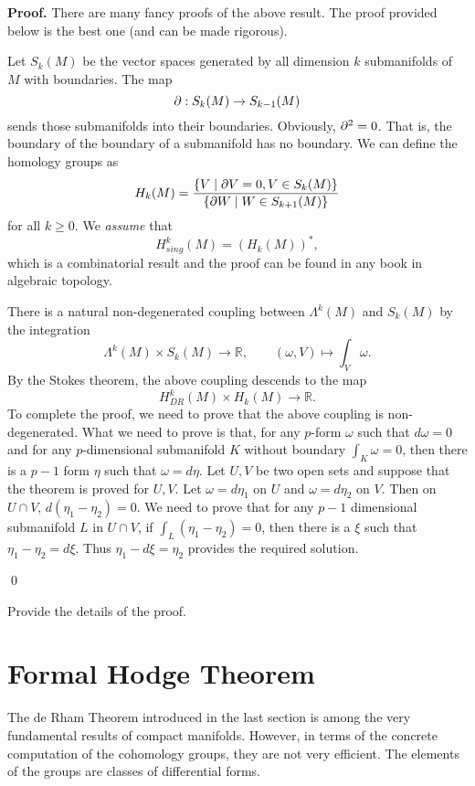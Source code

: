 {\bf Proof.} There are many fancy proofs of the above result. The proof provided below is the best one (and can be made rigorous).


Let $S_k(M)$ be the vector spaces generated by all dimension $k$ submanifolds of $M$ with boundaries. The map
\[
\partial: S_k(M)\to S_{k-1}(M)
\]
sends those submanifolds into their boundaries. Obviously, $\partial^2=0$. That is, the boundary of the boundary of a submanifold has no boundary.
We can define the homology groups as
\[
H_k(M)=\frac{\{V\mid \partial V=0,  V\in S_k(M)\}}{\{\partial W\mid W\in S_{k+1}(M)\}}
\]
for all $k\geq 0$. 
We {\it assume} that 
\[
H_{sing}^k(M)=(H_k(M))^*,
\]
which is a combinatorial result and the proof can be found in any book in algebraic topology.

There is a natural non-degenerated coupling between $\Lambda^k(M)$ and $S_k(M)$ by the integration
\[
\Lambda^k(M)\times S_k(M)\to \mathbb R,\qquad (\omega,V)\mapsto \int_V\omega.
\]
By the Stokes theorem, the above coupling descends to the map
\[
H^k_{DR}(M)\times H_k(M)\to\mathbb R.
\]
To complete the proof, we need to prove that the above coupling is non-degenerated. What we need to prove is that, for any $p$-form $\omega$ such that $d\omega=0$ and for any $p$-dimensional submanifold $K$ without boundary $\int_K\omega=0$, then there is a $p-1$ form $\eta$ such that $\omega=d\eta$. Let $U,V$ be two open sets and suppose that the theorem is proved for $U,V$. Let $\omega=d\eta_1$ on $U$ and $\omega=d\eta_2$ on $V$. Then on $U\cap V$, $d(\eta_1-\eta_2)=0$.
We need to prove that for any $p-1$ dimensional 
submanifold $L$ in $U\cap V$, if $\int _L(\eta_1-\eta_2)=0$, then there is a $\xi$ such that $\eta_1-\eta_2=d\xi$. Thus $\eta_1-d\xi=\eta_2$ provides the required solution.



\qed


\begin{ex} Provide the details of the proof.
\end{ex}

\section{Formal Hodge Theorem}\label{Formal_Hodge}

The de Rham  Theorem  introduced  in the last section is among the very fundamental results of
compact manifolds. However, in terms of the
concrete computation of the cohomology groups, they are not
very efficient.
The elements of the groups are classes of differential forms.

